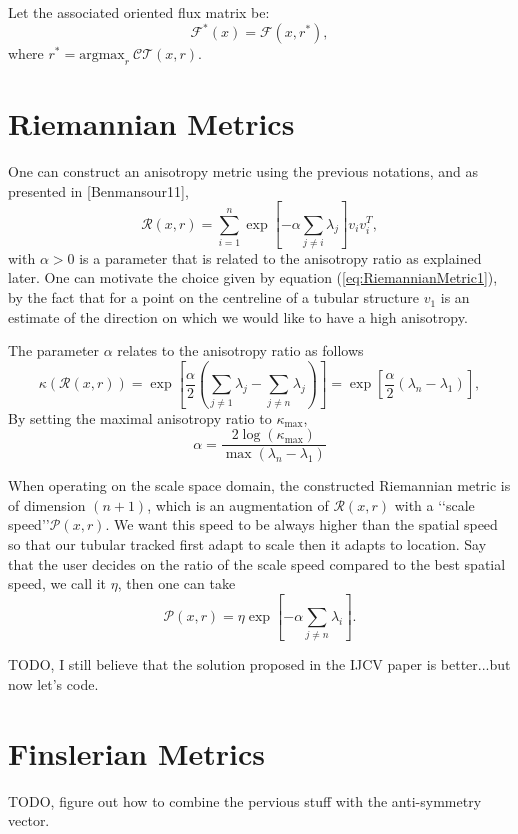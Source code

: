 \documentclass[11pt]{amsart}
\begin{document}
Let the associated oriented flux matrix be:
\begin{equation}\label{eq:OFSpace}
\mathcal{F}^*(x) = \mathcal{F}(x, r^*),
\end{equation}
where $r^* = \displaystyle\text{argmax}_{r} ~\mathcal{CT}(x, r)$.


\section{Riemannian Metrics}
One can construct an anisotropy metric using the previous notations, and as presented in [Benmansour11], 
\begin{equation}\label{eq:RiemannianMetric1}
\mathcal{R}(x, r) = \sum_{i=1}^n \exp\left[-\alpha\sum_{j\neq i}\lambda_j\right]v_i v_i^T,
\end{equation}
with $\alpha > 0$ is a parameter that is related to the anisotropy ratio as explained later. One can motivate the choice given by equation (\ref{eq:RiemannianMetric1}), by the fact that for a point on the centreline of a tubular structure $v_1$ is an estimate of the direction on which we would like to have a high anisotropy.

The parameter $\alpha$ relates to the anisotropy ratio as follows
\begin{equation}\label{eq:RiemannianAnisoRatio}
\kappa(\mathcal{R}(x, r)) =  \exp\left[\frac{\alpha}{2}\left(\sum_{j\neq 1}\lambda_j-\sum_{j\neq n}\lambda_j  \right)\right] = \exp\left[\frac{\alpha}{2}\left(\lambda_n - \lambda_1 \right)\right],
\end{equation}
By setting the maximal anisotropy ratio to $\kappa_{\max}$, 
\begin{equation}\label{eq:alpha}
\alpha =  \frac{2 \log(\kappa_{\max})}{\max( \lambda_n - \lambda_1)}
\end{equation}

When operating on the scale space domain, the constructed Riemannian metric is of dimension $(n+1)$, which is an augmentation of $\mathcal{R}(x, r)$ with a \lq\lq scale speed\rq\rq $\mathcal{P}(x, r)$. We want this speed to be always higher than the spatial speed so that our tubular tracked first adapt to scale then it adapts to location.
Say that the user decides on the ratio of the scale speed compared to the best spatial speed, we call it $\eta$, then one can take
\begin{equation}\label{eq:alpha}
\mathcal{P}(x, r)=  \eta\exp\left[-\alpha \sum_{j\neq n} \lambda_i \right].
\end{equation}

TODO, I still believe that the solution proposed in the IJCV paper is better...but now let's code.

\section{Finslerian Metrics}
TODO, figure out how to combine the pervious stuff with the anti-symmetry vector.
\end{document}
